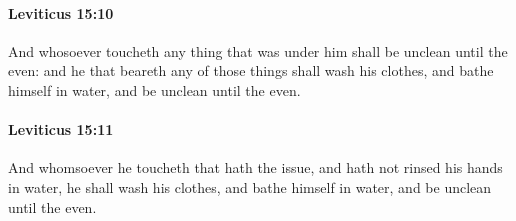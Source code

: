 		\paragraph{Leviticus 15:10} %
			\label{LEVITICUS-15-10}

			And whosoever toucheth any thing that was under him shall be unclean until the even: and he that beareth any of those things shall wash his clothes, and bathe himself in water, and be unclean until the even.


		\paragraph{Leviticus 15:11} %
			\label{LEVITICUS-15-11}

			And whomsoever he toucheth that hath the issue, and hath not rinsed his hands in water, he shall wash his clothes, and bathe himself in water, and be unclean until the even.

